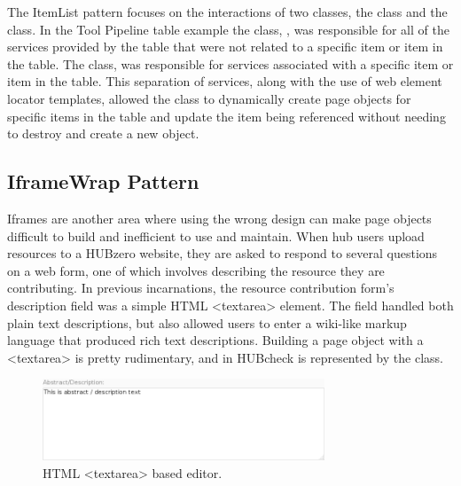 The ItemList pattern focuses on the interactions of two classes, the
 class and the  class. In the Tool Pipeline
table example the  class, , was
responsible for all of the services provided by the table that were not related
to a specific item or item in the table. The  class,
 was responsible for services associated with a specific
item or item in the table.  This separation of services, along with the use of
web element locator templates, allowed the  class to
dynamically create page objects for specific items in the table and update the
item being referenced without needing to destroy and create a new object.



\subsection{IframeWrap Pattern}
\label{ssec:iframewrap_pattern}

%

%
%

Iframes are another area where using the wrong design can make page objects
difficult to build and inefficient to use and maintain. When hub users upload
resources to a HUBzero website, they are asked to respond to several questions
on a web form, one of which involves describing the resource they are
contributing.  In previous incarnations, the resource contribution form's
description field was a simple HTML <textarea> element. The field handled both
plain text descriptions, but also allowed users to enter a wiki-like markup
language that produced rich text descriptions.  Building a page object with a
<textarea> is pretty rudimentary, and in HUBcheck is represented by the
 class.


\begin{figure}[tbh]
  \centering
  \includegraphics[width=0.75\textwidth]
    {../../images/hubzero_new_resource_compose_step_abstract_textarea.png}
  \caption{HTML <textarea> based editor. }
  \label{fig:html_textarea_editor_widget}
\end{figure}

